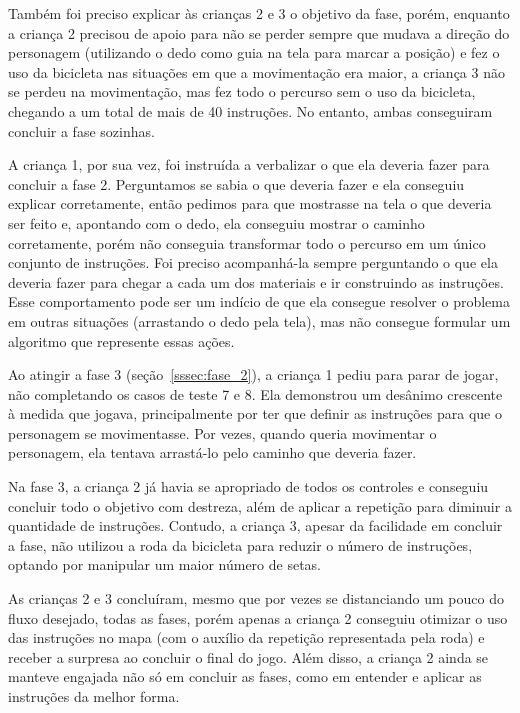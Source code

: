 Também foi preciso explicar às crianças 2 e 3 o objetivo da fase, porém, enquanto a criança 2 precisou de apoio para não se perder sempre que mudava a direção do personagem (utilizando o dedo como guia na tela para marcar a posição) e fez o uso da bicicleta nas situações em que a movimentação era maior, a criança 3 não se perdeu na movimentação, mas fez todo o percurso sem o uso da bicicleta, chegando a um total de mais de 40 instruções. No entanto, ambas conseguiram concluir a fase sozinhas.

A criança 1, por sua vez, foi instruída a verbalizar o que ela deveria fazer para concluir a fase 2. Perguntamos se sabia o que deveria fazer e ela conseguiu explicar corretamente, então pedimos para que mostrasse na tela o que deveria ser feito e, apontando com o dedo, ela conseguiu mostrar o caminho corretamente, porém não conseguia transformar todo o percurso em um único conjunto de instruções. Foi preciso acompanhá-la sempre perguntando o que ela deveria fazer para chegar a cada um dos materiais e ir construindo as instruções. Esse comportamento pode ser um indício de que ela consegue resolver o problema em outras situações (arrastando o dedo pela tela), mas não consegue formular um algoritmo que represente essas ações.

Ao atingir a fase 3 (seção~\ref{sssec:fase_2}), a criança 1 pediu para parar de jogar, não completando os casos de teste 7 e 8. Ela demonstrou um desânimo crescente à medida que jogava, principalmente por ter que definir as instruções para que o personagem se movimentasse. Por vezes, quando queria movimentar o personagem, ela tentava arrastá-lo pelo caminho que deveria fazer.

Na fase 3, a criança 2 já havia se apropriado de todos os controles e conseguiu concluir todo o objetivo com destreza, além de aplicar a repetição para diminuir a quantidade de instruções. Contudo, a criança 3, apesar da facilidade em concluir a fase, não utilizou a roda da bicicleta para reduzir o número de instruções, optando por manipular um maior número de setas.

As crianças 2 e 3 concluíram, mesmo que por vezes se distanciando um pouco do fluxo desejado, todas as fases, porém apenas a criança 2 conseguiu otimizar o uso das instruções no mapa (com o auxílio da repetição representada pela roda) e receber a surpresa ao concluir o final do jogo. Além disso, a criança 2 ainda se manteve engajada não só em concluir as fases, como em entender e aplicar as instruções da melhor forma.

